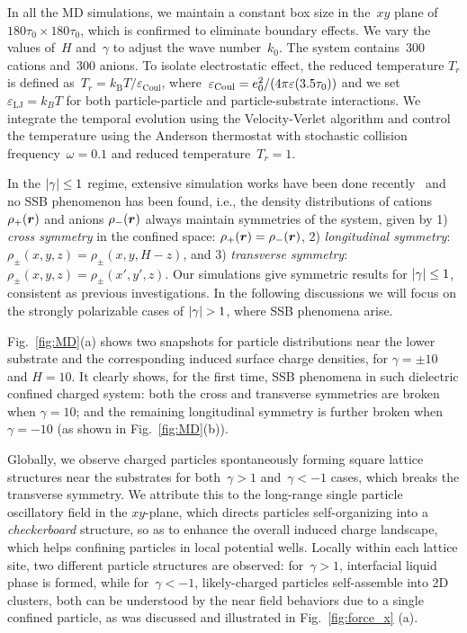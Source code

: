In all the MD simulations, we maintain a constant box size in the~$xy$ plane of~$180\tau_0 \times 180\tau_0$, which is confirmed to eliminate boundary effects.
We vary the values of~$H$ and~$\gamma$ to adjust the wave number~$k_0$. 
The system contains~$300$ cations and~$300$ anions.
To isolate electrostatic effect, the reduced temperature $T_r$ is defined as~$T_r =k_{\mathrm B}T/\varepsilon_{\mathrm{Coul}}$, where~$\varepsilon_{\mathrm{Coul}} = e_0^2/(4 \pi \varepsilon (3.5 \tau_0))$ and we set~$\varepsilon_{\mathrm{LJ}} = k_B T$ for both particle-particle and particle-substrate interactions. 
We integrate the temporal evolution using the Velocity-Verlet algorithm and control the temperature using the Anderson thermostat with stochastic collision frequency~$\omega = 0.1$ and reduced temperature~$T_r = 1$.

In the $\lvert\gamma\rvert\leq 1$ regime, extensive simulation works have been done recently~\cite{liang2020harmonic,yuan2021particle} and no SSB phenomenon has been found, i.e., the density distributions of cations $\rho_{+}(\boldsymbol{r})$ and anions $\rho_{-}(\boldsymbol{r})$  always maintain symmetries of the system, given by 1) \emph{cross symmetry} in the confined space: $\rho_{+}(\boldsymbol{r})=\rho_{-}(\boldsymbol{r})$, 2) \emph{longitudinal symmetry}: $\rho_{\pm}(x,y,z)=\rho_{\pm}(x,y,H-z)$, and 3) \emph{transverse symmetry}: $\rho_{\pm}(x,y,z)=\rho_{\pm}(x',y',z)$. 
Our simulations give symmetric results for  $\lvert\gamma\rvert\leq 1$, consistent as previous investigations.
In the following discussions we will focus on the strongly polarizable cases of $\lvert\gamma\rvert>1$, where SSB phenomena arise.

Fig.~\ref{fig:MD}(a) shows two snapshots for particle distributions near the lower substrate and the corresponding induced surface charge densities, for $\gamma=\pm10$ and $H=10$. It clearly shows, for the first time, SSB phenomena in such dielectric confined charged system: both the cross and transverse symmetries are broken when $\gamma=10$; and the remaining longitudinal symmetry is further broken when $\gamma=-10$ (as shown in Fig.~\ref{fig:MD}(b)).

Globally, we observe charged particles spontaneously forming square lattice structures near the substrates for both~$\gamma > 1$ and~$\gamma < -1$ cases, which breaks the transverse symmetry. 
We attribute this to the long-range single particle oscillatory field in the $xy$-plane, which directs particles self-organizing into a \emph{checkerboard} structure, so as to enhance the overall induced charge landscape, which helps confining particles in local potential wells.
Locally within each lattice site, two different particle structures are observed: for~$\gamma >1$, interfacial liquid phase is formed, while for~$\gamma < -1$, likely-charged particles self-assemble into 2D clusters, both can be understood by the near field behaviors due to a single confined particle, as was discussed and illustrated in Fig.~\ref{fig:force_x} (a).

